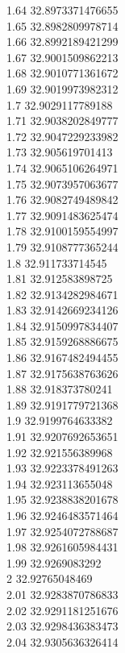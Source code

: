 {1.64	32.8973371476655\\
1.65	32.8982809978714\\
1.66	32.8992189421299\\
1.67	32.9001509862213\\
1.68	32.9010771361672\\
1.69	32.9019973982312\\
1.7	32.9029117789188\\
1.71	32.9038202849777\\
1.72	32.9047229233982\\
1.73	32.905619701413\\
1.74	32.9065106264971\\
1.75	32.9073957063677\\
1.76	32.9082749489842\\
1.77	32.9091483625474\\
1.78	32.9100159554997\\
1.79	32.9108777365244\\
1.8	32.911733714545\\
1.81	32.912583898725\\
1.82	32.9134282984671\\
1.83	32.9142669234126\\
1.84	32.9150997834407\\
1.85	32.9159268886675\\
1.86	32.9167482494455\\
1.87	32.9175638763626\\
1.88	32.918373780241\\
1.89	32.9191779721368\\
1.9	32.9199764633382\\
1.91	32.9207692653651\\
1.92	32.921556389968\\
1.93	32.9223378491263\\
1.94	32.923113655048\\
1.95	32.9238838201678\\
1.96	32.9246483571464\\
1.97	32.9254072788687\\
1.98	32.9261605984431\\
1.99	32.9269083292\\
2	32.92765048469\\
2.01	32.9283870786833\\
2.02	32.9291181251676\\
2.03	32.9298436383473\\
2.04	32.9305636326414\\
}
